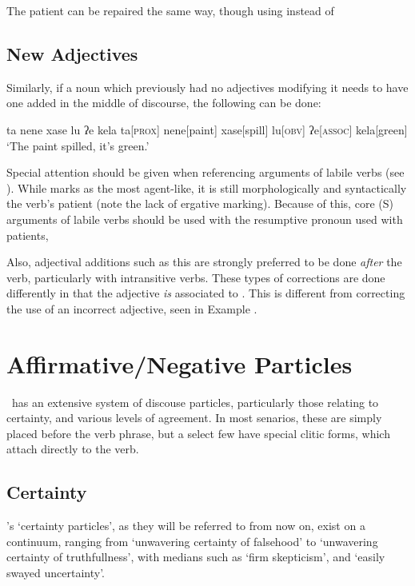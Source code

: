 The patient can be repaired the same way, though using  instead of 
\subsection{New Adjectives}
Similarly, if a noun which previously had no adjectives modifying it needs to have one added in the middle of discourse, the following can be done:

\ex
\begingl
\glpreamble ta nene xase lu ʔe kela
\endpreamble
ta[\textsc{prox}]
nene[paint]
xase[spill]
lu[\textsc{obv}]
ʔe[\textsc{assoc}]
kela[green]
\glft `The paint spilled, it's green.'
\endgl
\xe


Special attention should be given when referencing arguments of labile verbs (see ). While  marks  as the most agent-like, it is still morphologically and syntactically the verb's patient (note the lack of ergative marking). Because of this, core (S) arguments of labile verbs should be used with the resumptive pronoun used with patients, 

Also, adjectival additions such as this are strongly preferred to be done \textit{after} the verb, particularly with intransitive verbs. These types of corrections are done differently in that the adjective \textit{is} associated to . This is different from correcting the use of an incorrect adjective, seen in Example .

\section{Affirmative/Negative Particles}

\langname\ has an extensive system of discouse particles, particularly those relating to certainty, and various levels of agreement. In most senarios, these are simply placed before the verb phrase, but a select few have special clitic forms, which attach directly to the verb.

\subsection{Certainty}

\langname 's `certainty particles', as they will be referred to from now on, exist on a continuum, ranging from  `unwavering certainty of falsehood' to  `unwavering certainty of truthfullness', with medians such as  `firm skepticism', and  `easily swayed uncertainty'.

